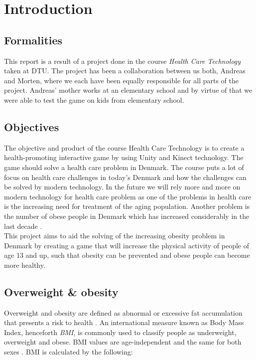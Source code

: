 \documentclass[11pt]{report}
\begin{document}
\begingroup
\tableofcontents
\let\clearpage\relax
\listoffigures
\let\clearpage\relax
\listoftables
\endgroup

\chapter{Introduction}
\section{Formalities}
This report is a result of a project done in the course \emph{Health Care Technology} taken at DTU. The project has been a collaboration between us both, Andreas and Morten, where we each have been equally responsible for all parts of the project. Andreas' mother works at an elementary school and by virtue of that we were able to test the game on kids from elementary school.

\section{Objectives}
The objective and product of the course Health Care Technology is to create a health-promoting interactive game by using Unity and Kinect technology. The game should solve a health care problem in Denmark. The course puts a lot of focus on health care challenges in today's Denmark and how the challenges can be solved by modern technology. In the future we will rely more and more on modern technology for health care problem as one of the problems in health care is the increasing need for treatment of the aging population. Another problem is the number of obese people in Denmark which has increased considerably in the last decade \cite{Sundhedsstyrelsen}.\\
This project aims to aid the solving of the increasing obesity problem in Denmark by creating a game that will increase the physical activity of people of age 13 and up, such that obesity can be prevented and obese people can become more healthy.

\section{Overweight \& obesity}
Overweight and obesity are defined as abnormal or excessive fat accumulation that presents a risk to health \cite{who-obesity}. An international measure known as Body Mass Index, henceforth \emph{BMI}, is commonly used to classify people as underweight, overweight and obese. BMI values are age-independent and the same for both sexes \cite{who-bmi}. BMI is calculated by the following:
\end{document}
